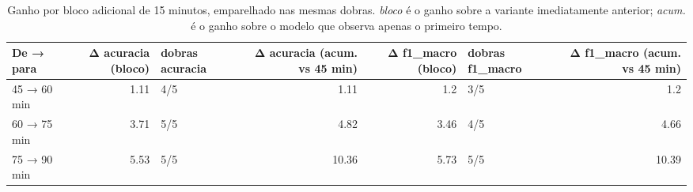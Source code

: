 \begin{table}[htbp]
\centering
\caption{Ganho por bloco adicional de 15 minutos, emparelhado nas mesmas dobras. \emph{bloco} é o ganho sobre a variante imediatamente anterior; \emph{acum.} é o ganho sobre o modelo que observa apenas o primeiro tempo.}
\label{tab:wp5-incrementos}
\small
\begin{tabular}{lrlrrlr}
\toprule
De → para & Δ acuracia (bloco) & dobras acuracia & Δ acuracia (acum. vs 45 min) & Δ f1\_macro (bloco) & dobras f1\_macro & Δ f1\_macro (acum. vs 45 min) \\
\midrule
45 → 60 min & 1.11 & 4/5 & 1.11 & 1.2 & 3/5 & 1.2 \\
60 → 75 min & 3.71 & 5/5 & 4.82 & 3.46 & 4/5 & 4.66 \\
75 → 90 min & 5.53 & 5/5 & 10.36 & 5.73 & 5/5 & 10.39 \\
\bottomrule
\end{tabular}
\end{table}
